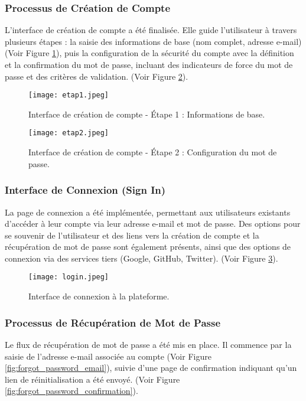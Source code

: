 \documentclass[12pt, a4paper]{article}
\begin{document}
\subsubsection{Processus de Création de Compte}
L'interface de création de compte a été finalisée. Elle guide l'utilisateur à travers plusieurs étapes : la saisie des informations de base (nom complet, adresse e-mail) (Voir Figure \ref{fig:signup_basic_info}), puis la configuration de la sécurité du compte avec la définition et la confirmation du mot de passe, incluant des indicateurs de force du mot de passe et des critères de validation. (Voir Figure \ref{fig:signup_security}).

\begin{figure}[htbp]
  \centering
  \texttt{[image: etap1.jpeg]} 
  \caption{Interface de création de compte - Étape 1 : Informations de base.}
  \label{fig:signup_basic_info}
\end{figure}

\begin{figure}[htbp]
  \centering
  \texttt{[image: etap2.jpeg]} 
  \caption{Interface de création de compte - Étape 2 : Configuration du mot de passe.}
  \label{fig:signup_security}
\end{figure}

\subsubsection{Interface de Connexion (Sign In)}
La page de connexion a été implémentée, permettant aux utilisateurs existants d'accéder à leur compte via leur adresse e-mail et mot de passe. Des options pour se souvenir de l'utilisateur et des liens vers la création de compte et la récupération de mot de passe sont également présents, ainsi que des options de connexion via des services tiers (Google, GitHub, Twitter). (Voir Figure \ref{fig:signin_page}).

\begin{figure}[htbp]
  \centering
  \texttt{[image: login.jpeg]} 
  \caption{Interface de connexion à la plateforme.}
  \label{fig:signin_page}
\end{figure}

\subsubsection{Processus de Récupération de Mot de Passe}
Le flux de récupération de mot de passe a été mis en place. Il commence par la saisie de l'adresse e-mail associée au compte (Voir Figure \ref{fig:forgot_password_email}), suivie d'une page de confirmation indiquant qu'un lien de réinitialisation a été envoyé. (Voir Figure \ref{fig:forgot_password_confirmation}).
\end{document}
